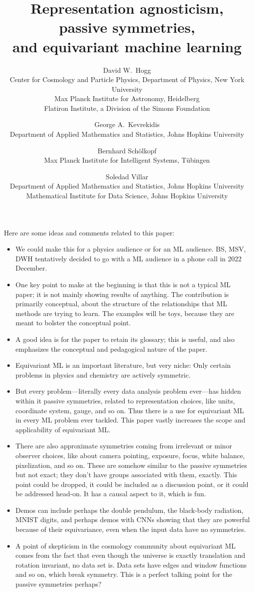 \documentclass[11pt]{article}
\title{\bfseries%
Representation agnosticism, passive symmetries,\\ and equivariant machine learning}
\author{%
  David W.~Hogg\\
{\footnotesize Center for Cosmology and Particle Physics, Department of Physics, New York University}\\[-0.5ex]
{\footnotesize Max Planck Institute for Astronomy, Heidelberg}\\[-0.5ex]
{\footnotesize Flatiron Institute, a Division of the Simons Foundation}
  \and
  George A.~Kevrekidis\\
{\footnotesize Department of Applied Mathematics and Statistics, Johns Hopkins University}
  \and
  Bernhard Sch\"olkopf\\
{\footnotesize Max Planck Institute for Intelligent Systems, T\"ubingen}
  \and
  Soledad Villar\\
{\footnotesize Department of Applied Mathematics and Statistics, Johns Hopkins University}\\[-0.5ex]
{\footnotesize Mathematical Institute for Data Science, Johns Hopkins University}
}
\date{}
\begin{document}
\maketitle



Here are some ideas and comments related to this paper:
\begin{itemize}
  \item We could make this for a physics audience or for an ML audience. BS, MSV, DWH tentatively decided to go with a ML audience in a phone call in 2022 December.
  \item One key point to make at the beginning is that this is not a typical ML paper; it is not mainly showing results of anything. The contribution is primarily conceptual, about the structure of the relationships that ML methods are trying to learn. The examples will be toys, because they are meant to bolster the conceptual point.
  \item A good idea is for the paper to retain its glossary; this is useful, and also emphasizes the conceptual and pedagogical nature of the paper.
  \item Equivariant ML is an important literature, but very niche: Only certain problems in physics and chemistry are actively symmetric.
  \item But every problem---literally every data analysis problem ever---has hidden within it passive symmetries, related to representation choices, like units, coordinate system, gauge, and so on. Thus there is a use for equivariant ML in every ML problem ever tackled. This paper vastly increases the scope and applicability of equivariant ML.
  \item There are also approximate symmetries coming from irrelevant or minor observer choices, like about camera pointing, exposure, focus, white balance, pixelization, and so on. These are somehow similar to the passive symmetries but not exact; they don't have groups associated with them, exactly. This point could be dropped, it could be included as a discussion point, or it could be addressed head-on. It has a causal aspect to it, which is fun.
  \item Demos can include perhaps the double pendulum, the black-body radiation, MNIST digits, and perhaps demos with CNNs showing that they are powerful because of their equivariance, even when the input data have no symmetries.
  \item A point of skepticism in the cosmology community about equivariant ML comes from the fact that even though the universe is exactly translation and rotation invariant, no data set is. Data sets have edges and window functions and so on, which break symmetry. This is a perfect talking point for the passive symmetries perhaps?

\end{itemize}
\end{document}
